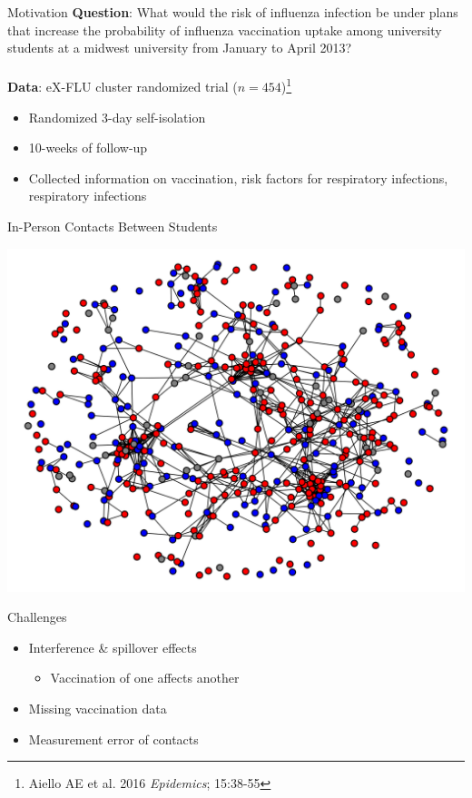 \documentclass{beamer}
\begin{document}
\begin{frame}{Motivation}
	\textbf{Question}: What would the risk of influenza infection be under plans that increase the probability of influenza vaccination uptake among university students at a midwest university from January to April 2013?
	~\\~\\
	\textbf{Data}: eX-FLU cluster randomized trial ($n=454$)\footnote[frame]{Aiello AE et al. 2016 \textit{Epidemics}; 15:38-55}
	\begin{itemize}
		\item Randomized 3-day self-isolation
		\item 10-weeks of follow-up
		\item Collected information on vaccination, risk factors for respiratory infections, respiratory infections
	\end{itemize}
\end{frame}

\begin{frame}{In-Person Contacts Between Students}
	\begin{center}
		\includegraphics[width=0.95\linewidth]{images/exflu_network.png}
	\end{center}
\end{frame}

\begin{frame}{Challenges}
	\begin{itemize}
		\item[1.] Interference \& spillover effects
		\begin{itemize}
			\item Vaccination of one affects another
		\end{itemize}
		\item[2.] Missing vaccination data
		\item[3.] Measurement error of contacts
	\end{itemize}
\end{frame}
\end{document}
